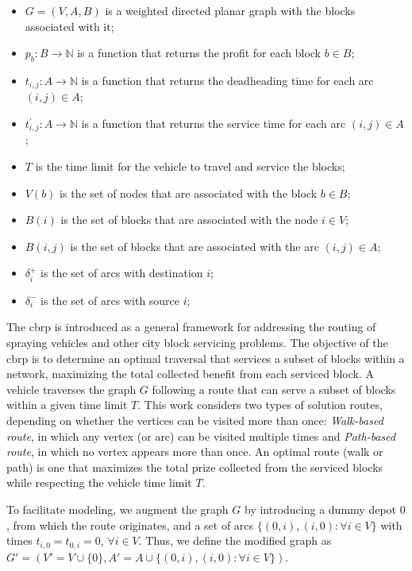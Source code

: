 \begin{itemize}
	\item $G = (V, A, B)$ is a weighted directed planar graph with the blocks associated with it;
	\item $p_b : B \rightarrow \mathbb{N}$ is a function that returns the profit
	      for each block $b \in B$;
	\item $t_{i, j} : A \rightarrow \mathbb{N}$ is a function that returns the
	      deadheading time for each arc $(i, j) \in A$;
	\item $t^{'}_{i, j} : A \rightarrow \mathbb{N}$ is a function that returns
	      the service time for each arc $(i, j) \in A$;
	\item $T$ is the time limit for the vehicle to travel and service the blocks;
	\item $V(b)$ is the set of nodes that are associated with the block $b \in B$;
	\item $B(i)$ is the set of blocks that are associated with the node $i \in V$;
	\item $B(i, j)$ is the set of blocks that are associated with the arc $(i, j) \in A$;
	\item $\delta^{+}_{i}$ is the set of arcs with destination $i$;
	\item $\delta^{-}_{i}$ is the set of arcs with source $i$;
\end{itemize}

The \gls{cbrp} is introduced as a general framework for addressing the routing of
spraying vehicles and other city block servicing problems. 
The objective of the \gls{cbrp} is to determine an optimal traversal that 
services a subset of blocks within a network, maximizing the total 
collected benefit from each serviced block. 
A vehicle traverses the graph $G$ following a route that can serve a
subset of blocks within a given time limit $T$. This work considers two types of 
solution routes, depending on whether the vertices can be
visited more than once: \textit{Walk-based route}, in which any vertex (or arc)
can be visited multiple times and \textit{Path-based route}, in which no vertex
appears more than once. 
An optimal route (walk or path) is one that maximizes
the total prize collected from the serviced blocks while respecting the vehicle
time limit $T$.

To facilitate modeling, we augment the graph $G$ by introducing a dummy depot
$0$, from which the route originates, and a set of arcs $\{(0, i), (i, 0) :
	\forall i \in V\}$ with times $t_{i,0} = t_{0,i} = 0$, $\forall i \in V$. 
Thus, we define the modified graph as $G' = (V' = V \cup \{0\}, A' = A \cup \{(0,
	i), (i, 0) : \forall i \in V\})$.

